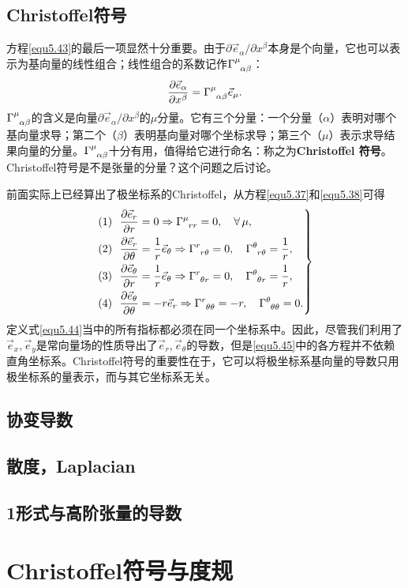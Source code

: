 \subsection*{Christoffel符号}
方程\eqref{equ5.43}的最后一项显然十分重要。由于$\partial \vec{e}_\alpha / \partial x^\beta$本身是个向量，它也可以表示为基向量的线性组合；线性组合的系数记作$\Gamma\indices{^\mu_{\alpha \beta}}$：
\begin{equation}
    \frac{\partial \vec{e}_\alpha}{\partial x^\beta} = \Gamma\indices{^\mu_{\alpha \beta}} \vec{e}_\mu.
\label{equ5.44}
\end{equation}
$\Gamma\indices{^\mu_{\alpha \beta}}$的含义是向量$\partial \vec{e}_\alpha / \partial x^\beta$的$\mu$分量。它有三个分量：一个分量（$\alpha$）表明对哪个基向量求导；第二个（$\beta$）表明基向量对哪个坐标求导；第三个（$\mu$）表示求导结果向量的分量。$\Gamma\indices{^\mu_{\alpha \beta}}$十分有用，值得给它进行命名：称之为\textbf{Christoffel 符号}。Christoffel符号是不是张量的分量？这个问题之后讨论。

前面实际上已经算出了极坐标系的Christoffel，从方程\eqref{equ5.37}和\eqref{equ5.38}可得
\begin{equation}
\left.
\begin{split}
    (1)\ \ \dfrac{\partial \vec{e}_r}{\partial r} &= 0  \Rightarrow \Gamma\indices{^\mu_{rr}} = 0, \quad \forall\, \mu, \\
    (2)\ \  \dfrac{\partial \vec{e}_r}{\partial \theta} &= \dfrac{1}{r} \vec{e}_\theta \Rightarrow  \Gamma\indices{^r_{r\theta}} = 0, \quad \Gamma\indices{^\theta_{r \theta}} = \dfrac{1}{r}, \\
    (3)\ \  \dfrac{\partial \vec{e}_\theta}{\partial r} &= \dfrac{1}{r} \vec{e}_\theta \Rightarrow \Gamma\indices{^r_{\theta r}} = 0, \quad \Gamma\indices{^\theta_{\theta r}} = \dfrac{1}{r}, \\
    (4)\ \  \dfrac{\partial \vec{e}_\theta}{\partial \theta} &= -r \vec{e}_r \Rightarrow \Gamma\indices{^r_{\theta \theta}} = -r, \quad \Gamma\indices{^\theta_{\theta \theta}} = 0.
\end{split}
\right\}
\label{equ5.45}
\end{equation}
定义式\eqref{equ5.44}当中的所有指标都必须在同一个坐标系中。因此，尽管我们利用了$\vec{e}_x, \vec{e}_y$是常向量场的性质导出了$\vec{e}_r, \vec{e}_\theta$的导数，但是\eqref{equ5.45}中的各方程并不依赖直角坐标系。Christoffel符号的重要性在于，它可以将极坐标系基向量的导数只用极坐标系的量表示，而与其它坐标系无关。

\subsection*{协变导数}


\subsection*{散度，Laplacian}

\subsection*{1形式与高阶张量的导数}

\section{Christoffel符号与度规}
\label{sec5.4}